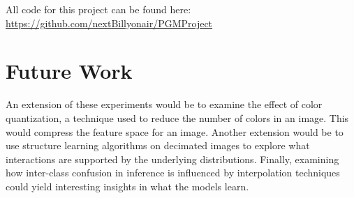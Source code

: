 \documentclass{article}
\begin{document}
All code for this project can be found here: \url{https://github.com/nextBillyonair/PGMProject}


\section{Future Work}
An extension of these experiments would be to examine the effect of color
quantization, a technique used to reduce the number of colors in an image. This
would compress the feature space for an image. Another extension would
be to use structure learning algorithms on decimated images to explore
what interactions are supported by the underlying distributions. Finally,
examining how inter-class confusion in inference is influenced by interpolation
techniques could yield interesting insights in what the models learn.









\end{document}
